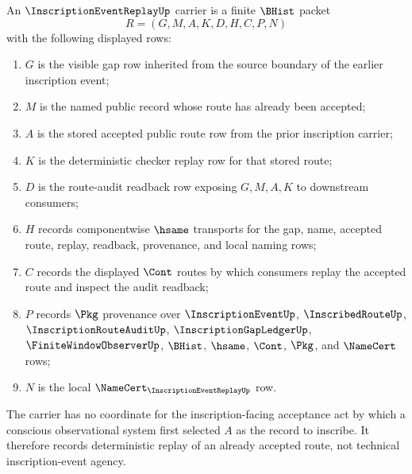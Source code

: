 \begin{definition}
\label{def:inscription-event-replay-carrier}
An $\InscriptionEventReplayUp$ carrier is a finite $\BHist$ packet
$$
R=(G,M,A,K,D,H,C,P,N)
$$
with the following displayed rows:
\begin{enumerate}
\item $G$ is the visible gap row inherited from the source boundary of the earlier inscription event;
\item $M$ is the named public record whose route has already been accepted;
\item $A$ is the stored accepted public route row from the prior inscription carrier;
\item $K$ is the deterministic checker replay row for that stored route;
\item $D$ is the route-audit readback row exposing $G,M,A,K$ to downstream consumers;
\item $H$ records componentwise $\hsame$ transports for the gap, name, accepted route, replay, readback, provenance, and local naming rows;
\item $C$ records the displayed $\Cont$ routes by which consumers replay the accepted route and inspect the audit readback;
\item $P$ records $\Pkg$ provenance over $\InscriptionEventUp$, $\InscribedRouteUp$, $\InscriptionRouteAuditUp$, $\InscriptionGapLedgerUp$, $\FiniteWindowObserverUp$, $\BHist$, $\hsame$, $\Cont$, $\Pkg$, and $\NameCert$ rows;
\item $N$ is the local $\NameCert_{\InscriptionEventReplayUp}$ row.
\end{enumerate}
The carrier has no coordinate for the inscription-facing acceptance act by which a conscious observational system first selected $A$ as the record to inscribe. It therefore records deterministic replay of an already accepted route, not technical inscription-event agency.
\end{definition}

